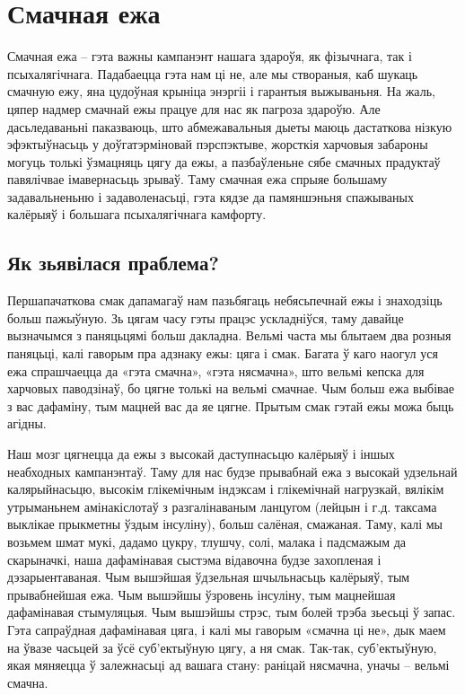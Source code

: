 \chapter{Смачная ежа}

Смачная ежа – гэта важны кампанэнт нашага здароўя, як фізычнага, так і псыхалягічнага. Падабаецца гэта нам ці не, але мы створаныя, каб шукаць смачную ежу, яна цудоўная крыніца энэргіі і гарантыя выжываньня. На жаль, цяпер надмер смачнай ежы працуе для нас як пагроза здароўю. Але дасьледаваньні паказваюць, што абмежавальныя дыеты маюць дастаткова нізкую эфэктыўнасьць у доўгатэрміновай пэрспэктыве, жорсткія харчовыя забароны могуць толькі ўзмацняць цягу да ежы, а пазбаўленьне сябе смачных прадуктаў павялічвае імавернасьць зрываў. Таму смачная ежа спрыяе большаму задавальненьню і задаволенасьці, гэта кядзе да памяншэньня спажываных калёрыяў і большага псыхалягічнага камфорту.

\section{Як зьявілася праблема?}

Першапачаткова смак дапамагаў нам пазьбягаць небясьпечнай ежы і знаходзіць больш пажыўную. Зь цягам часу гэты працэс ускладніўся, таму давайце вызначымся з паняцьцямі больш дакладна. Вельмі часта мы блытаем два розныя паняцьці, калі гаворым пра адзнаку ежы: цяга і смак. Багата ў каго наогул уся ежа спрашчаецца да «гэта смачна», «гэта нясмачна», што вельмі кепска для харчовых паводзінаў, бо цягне толькі на вельмі смачнае. Чым больш ежа выбівае з вас дафаміну, тым мацней вас да яе цягне. Прытым смак гэтай ежы можа быць агідны.

Наш мозг цягнецца да ежы з высокай даступнасьцю калёрыяў і іншых неабходных кампанэнтаў. Таму для нас будзе прывабнай ежа з высокай удзельнай калярыйнасьцю, высокім глікемічным індэксам і глікемічнай нагрузкай, вялікім утрыманьнем амінакіслотаў з разгалінаваным ланцугом (лейцын і г.д. таксама выклікае прыкметны ўздым інсуліну), больш салёная, смажаная. Таму, калі мы возьмем шмат мукі, дадамо цукру, тлушчу, солі, малака і падсмажым да скарыначкі, наша дафамінавая сыстэма відавочна будзе захопленая і дэзарыентаваная. Чым вышэйшая ўдзельная шчыльнасьць калёрыяў, тым прывабнейшая ежа. Чым вышэйшы ўзровень інсуліну, тым мацнейшая дафамінавая стымуляцыя. Чым вышэйшы стрэс, тым болей трэба зьесьці ў запас. Гэта сапраўдная дафамінавая цяга, і калі мы гаворым «смачна ці не», дык маем на ўвазе часьцей за ўсё суб'ектыўную цягу, а ня смак. Так-так, суб'ектыўную, якая мяняецца ў залежнасьці ад вашага стану: раніцай нясмачна, уначы – вельмі смачна.


